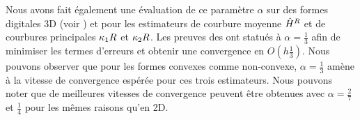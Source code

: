 Nous avons fait également une évaluation de ce paramètre $\alpha$ sur des formes
digitales 3D (voir ) \RoundedCube et
\Goursat pour les estimateurs de courbure moyenne $\hat{H}^{R}$ et de
courbures principales $\kappa_{1}{R}$ et $\kappa_{2}{R}$. Les preuves des
ont statués à $\alpha = \frac{1}{3}$ afin de minimiser les termes d'erreurs et
obtenir une convergence en $O(h\frac{1}{3})$. Nous pouvons observer que pour les
formes convexes comme non-convexe, $\alpha = \frac{1}{3}$ amène à la vitesse de
convergence espérée pour ces trois estimateurs. Nous pouvons noter que de
meilleures vitesses de convergence peuvent être obtenues avec $\alpha =
\frac{2}{7}$ et $\frac{1}{4}$ pour les mêmes raisons qu'en 2D.


